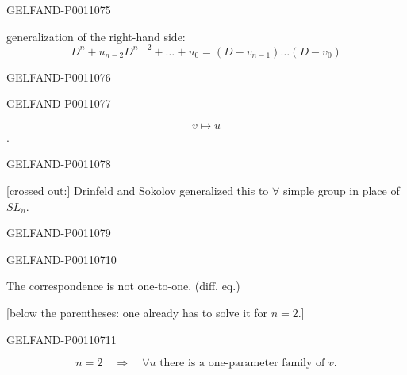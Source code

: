 \begin{GelfandAdjacentEvidence}{GELFAND-P001107}{5}


generalization of the right-hand side:
\[
D^n+u_{n-2}D^{n-2}+\ldots+u_0=(D-v_{n-1})\ldots(D-v_0)
\]
\end{GelfandAdjacentEvidence}
\begin{GelfandAdjacentEvidence}{GELFAND-P001107}{6}

\end{GelfandAdjacentEvidence}
\begin{GelfandAdjacentEvidence}{GELFAND-P001107}{7}


\[
v\longmapsto u
\]
.
\end{GelfandAdjacentEvidence}
\begin{GelfandAdjacentEvidence}{GELFAND-P001107}{8}


[crossed out:] Drinfeld and Sokolov generalized this to $\forall$ simple group in place of $SL_n$.
\end{GelfandAdjacentEvidence}
\begin{GelfandAdjacentEvidence}{GELFAND-P001107}{9}

\end{GelfandAdjacentEvidence}
\begin{GelfandAdjacentEvidence}{GELFAND-P001107}{10}


The correspondence is not one-to-one. (diff. eq.)

[below the parentheses: one already has to solve it for $n=2$.]
\end{GelfandAdjacentEvidence}
\begin{GelfandAdjacentEvidence}{GELFAND-P001107}{11}

\[
n=2\quad\Rightarrow\quad\forall u\text{ there is a one-parameter family of }v.
\]
\end{GelfandAdjacentEvidence}

